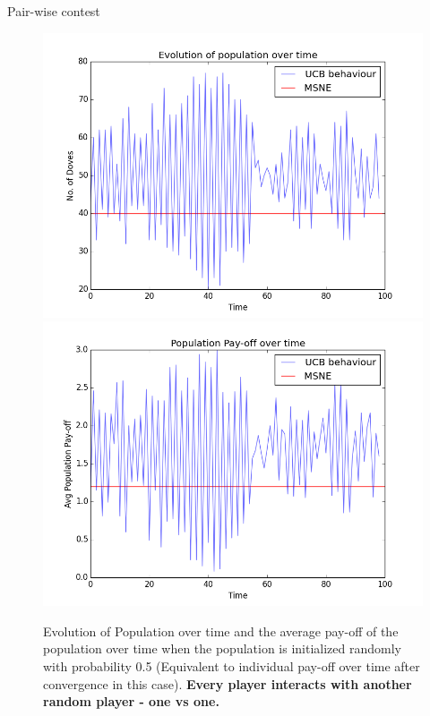 \documentclass{IFES-beamer}
\begin{document}
        \begin{frame}{Pair-wise contest}
            \begin{figure}
                \centering
                \includegraphics[scale=0.25]{Images/UCB/Population/pair_100_100_epochs.png}
                \includegraphics[scale=0.25]{Images/UCB/Pay-off/pay-off_pair_100_100_epochs.png}
                \caption{Evolution of Population over time and the average pay-off of the population over time when the population is initialized randomly with probability 0.5 (Equivalent to individual pay-off over time after convergence in this case). \textbf{Every player interacts with another random player - one vs one.}}
                \label{fig:my_label}
            \end{figure}
        \end{frame}
        
\end{document}
